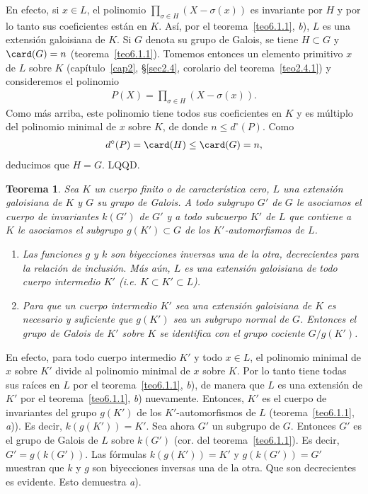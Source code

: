 \documentclass[bibtotoc,leqno,spanish]{amsbook}
\let\emph\relax %
\newcommand{\QED}{LQQD.}
\numberwithin{equation}{section}
\theoremstyle{note}
\theoremstyle{note}
\newtheorem{theorem}{Teorema}
\theoremstyle{rem}
\numberwithin{theorem}{section}
\numberwithin{proposition}{section}
\numberwithin{definition}{section}
\numberwithin{lemma}{section}
\numberwithin{corollary}{section}
\numberwithin{example}{section}
\numberwithin{footnote}{section}%
\begin{document}
En efecto, si $x\in L$, el polinomio $\prod_{\sigma\in H}(X-\sigma(x))$ es invariante
por $H$ y por
lo tanto sus coeficientes est\'an en $K$. As\'i, por el
teorema~\ref{teo6.1.1}, {\itshape b}), $L$ es una extensi\'on
galoisiana de $K$. Si $G$ denota su grupo de Galois, se tiene $H\subset G$ y $\card(G) = n$
(teorema~\ref{teo6.1.1}). Tomemos entonces un elemento primitivo $x$ de $L$ sobre $K$
(cap\'itulo~\ref{cap2},
\S\ref{sec2.4}, corolario del teorema~\ref{teo2.4.1}) y consideremos el polinomio
\begin{gather*}
P(X) = \prod_{\sigma\in H}(X-\sigma(x)).
\end{gather*}
Como m\'as arriba, este polinomio tiene todos sus coeficientes en $K$ y es m\'ultiplo
del polinomio minimal
de $x$ sobre $K$, de donde $n\leq d^{\circ}(P)$. Como
\begin{gather*}
d^{\circ}(P) = \card(H)\leq\card(G) = n,
\end{gather*}
deducimos que $H = G$. \QED

\begin{theorem}\label{teo6.1.2}
Sea $K$ un cuerpo finito o de caracter\'istica cero, $L$ una extensi\'on galoisiana de $K$
y $G$ su grupo
de Galois. A todo subgrupo $G'$ de $G$ le asociamos  el cuerpo de invariantes $k(G')$
de $G'$ y a todo
subcuerpo $K'$ de $L$ que contiene a $K$ le asociamos el subgrupo $g(K')\subset G$ de
los $K'$-automorfismos
de $L$.
\begin{enumerate}%
\item[a)] Las funciones $g$ y $k$ son biyecciones inversas una de la otra, decrecientes
para la relaci\'on de
inclusi\'on. M\'as a\'un, $L$ es una extensi\'on galoisiana de todo cuerpo intermedio $K'$
(i.e. $K\subset K'\subset L$).
\item[b)] Para que un cuerpo intermedio $K'$ sea una extensi\'on galoisiana de $K$ es
necesario y suficiente que
$g(K')$ sea un subgrupo normal de $G$. Entonces el grupo de Galois de $K'$ sobre $K$
se identifica con el
grupo cociente $G/g(K')$.
\end{enumerate}%
\end{theorem}

En efecto, para todo cuerpo intermedio $K'$ y todo $x\in L$, el polinomio minimal de $x$
sobre $K'$ divide
al polinomio minimal de $x$ sobre $K$. Por lo tanto tiene todas sus ra\'ices en $L$ por
el teorema~\ref{teo6.1.1}, {\itshape b}),
de manera que $L$ es una extensi\'on \emph{galoisiana} de $K'$ por el teorema~\ref{teo6.1.1},
{\itshape b}) nuevamente.
Entonces, $K'$ es el cuerpo de invariantes del grupo $g(K')$ de los $K'$-automorfismos de $L$
(teorema~\ref{teo6.1.1}, {\itshape a})). Es decir, $k(g(K')) = K'$. Sea ahora $G'$
un subgrupo de $G$. Entonces
$G'$ es el grupo de Galois de $L$ sobre $k(G')$ (cor. del teorema~\ref{teo6.1.1}).
Es decir, $G' = g(k(G'))$.
Las f\'ormulas $k(g(K')) = K'$ y $g(k(G')) = G'$ muestran que $k$ y $g$ son biyecciones
inversas una de la otra.
Que son decrecientes es evidente. Esto demuestra {\itshape a}).
\end{document}
